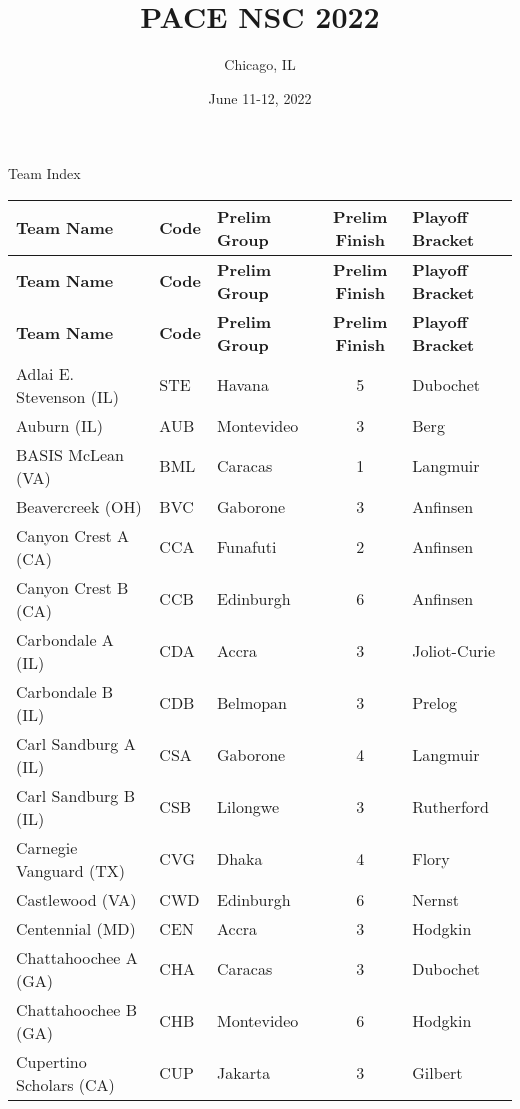 \documentclass{article}%
\title{PACE NSC 2022}%
\author{Chicago, IL}%
\date{June 11{-}12, 2022}%
\begin{document}
%
\normalsize%
%
\maketitle%
\vspace*{48pt}%
\begin{center}%
\begin{Huge}%
Team Index%
\end{Huge}%
\end{center}%
\newpage%
%
%
\begin{longtable}{|ll|lc|l|}%
\rowcolor{gray!30}%
\hline%
\textbf{Team Name} & \textbf{Code}&\textbf{Prelim Group}&\textbf{Prelim Finish}&\textbf{Playoff Bracket}\\%
\hline%
\endhead%
\hline%
\rowcolor{gray!25}%
\textbf{Team Name} & \textbf{Code}&\textbf{Prelim Group}&\textbf{Prelim Finish}&\textbf{Playoff Bracket}\\%
\hline%
\endfoot%
\hline%
\hline\rowcolor{gray!25}%
\textbf{Team Name} & \textbf{Code}&\textbf{Prelim Group}&\textbf{Prelim Finish}&\textbf{Playoff Bracket}\\%
\hline%
\endlastfoot%
\hline%
Adlai E. Stevenson (IL)&STE&Havana&5&Dubochet\\%
Auburn (IL)&AUB&Montevideo&3&Berg\\%
BASIS McLean (VA)&BML&Caracas&1&Langmuir\\%
Beavercreek (OH)&BVC&Gaborone&3&Anfinsen\\%
Canyon Crest A (CA)&CCA&Funafuti&2&Anfinsen\\%
Canyon Crest B (CA)&CCB&Edinburgh&6&Anfinsen\\%
Carbondale A (IL)&CDA&Accra&3&Joliot{-}Curie\\%
Carbondale B (IL)&CDB&Belmopan&3&Prelog\\%
Carl Sandburg A (IL)&CSA&Gaborone&4&Langmuir\\%
Carl Sandburg B (IL)&CSB&Lilongwe&3&Rutherford\\%
Carnegie Vanguard (TX)&CVG&Dhaka&4&Flory\\%
Castlewood (VA)&CWD&Edinburgh&6&Nernst\\%
Centennial (MD)&CEN&Accra&3&Hodgkin\\%
Chattahoochee A (GA)&CHA&Caracas&3&Dubochet\\%
Chattahoochee B (GA)&CHB&Montevideo&6&Hodgkin\\%
Cupertino Scholars (CA)&CUP&Jakarta&3&Gilbert\\%

\end{longtable}
\end{document}
